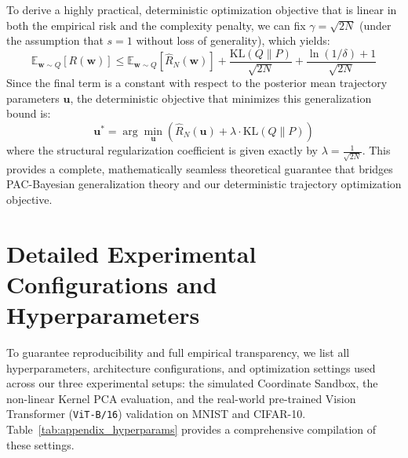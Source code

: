 To derive a highly practical, deterministic optimization objective that is linear in both the empirical risk and the complexity penalty, we can fix $\gamma = \sqrt{2N}$ (under the assumption that $s=1$ without loss of generality), which yields:
\begin{equation}
\mathbb{E}_{\mathbf{w} \sim Q} [R(\mathbf{w})] \le \mathbb{E}_{\mathbf{w} \sim Q} [\hat{R}_N(\mathbf{w})] + \frac{\text{KL}(Q \| P)}{\sqrt{2N}} + \frac{\ln(1/\delta) + 1}{\sqrt{2N}}
\end{equation}
Since the final term is a constant with respect to the posterior mean trajectory parameters $\mathbf{u}$, the deterministic objective that minimizes this generalization bound is:
\begin{equation}
\mathbf{u}^* = \arg\min_{\mathbf{u}} \left( \hat{R}_N(\mathbf{u}) + \lambda \cdot \text{KL}(Q \| P) \right)
\end{equation}
where the structural regularization coefficient is given exactly by $\lambda = \frac{1}{\sqrt{2N}}$. This provides a complete, mathematically seamless theoretical guarantee that bridges PAC-Bayesian generalization theory and our deterministic trajectory optimization objective.

\section{Detailed Experimental Configurations and Hyperparameters}
\label{sec:appendix_hyperparams}

To guarantee reproducibility and full empirical transparency, we list all hyperparameters, architecture configurations, and optimization settings used across our three experimental setups: the simulated Coordinate Sandbox, the non-linear Kernel PCA evaluation, and the real-world pre-trained Vision Transformer (\texttt{ViT-B/16}) validation on MNIST and CIFAR-10. Table~\ref{tab:appendix_hyperparams} provides a comprehensive compilation of these settings.

